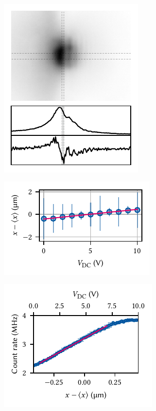 \begin{marginfigure}
    \centering
    \includegraphics{img/pdf/setup/knife_edge}
    \caption[]{}
    \label{fig:}
\end{marginfigure}

\begin{marginfigure}
    \centering
    \includegraphics{img/pdf/setup/knife_edge_fits}
    \caption[]{}
    \label{fig:}
\end{marginfigure}

\begin{marginfigure}
    \centering
    \includegraphics{img/pdf/setup/knife_edge_slope}
    \caption[]{}
    \label{fig:}
\end{marginfigure}

